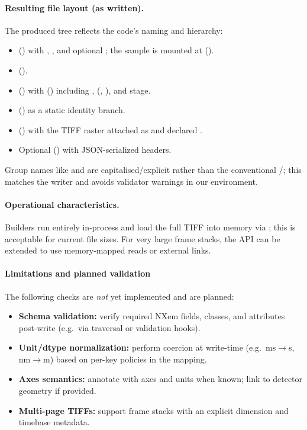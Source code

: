 \paragraph{Resulting file layout (as written).}
The produced tree reflects the code’s naming and hierarchy:
\begin{itemize}
	\item {} () with , , and optional ; the sample is mounted at  ().
	\item {} ().
	\item {} () with  () including ,  (, ), and  stage.
	\item {} () as a static identity branch.
	\item {} () with the TIFF raster attached as  and declared .
	\item Optional  () with JSON-serialized headers.
\end{itemize}
\noindent Group names like  and  are capitalised/explicit rather than the conventional /; this matches the writer and avoids validator warnings in our environment.

\paragraph{Operational characteristics.}
Builders run entirely in-process and load the full TIFF into memory via ; this is acceptable for current file sizes. For very large frame stacks, the API can be extended to use memory-mapped reads or external links.

\paragraph{Limitations and planned validation}\label{sec:nexus-construction-validation-future}
The following checks are \emph{not} yet implemented and are planned:
\begin{itemize}
	\item \textbf{Schema validation:} verify required NXem fields, classes, and attributes post-write (e.g.\ via  traversal or  validation hooks).
	\item \textbf{Unit/dtype normalization:} perform coercion at write-time (e.g.\ ms$\to$s, nm$\to$m) based on per-key policies in the mapping.
	\item \textbf{Axes semantics:} annotate  with axes and units when known; link to detector geometry if provided.
	\item \textbf{Multi-page TIFFs:} support frame stacks with an explicit  dimension and timebase metadata.
\end{itemize}

